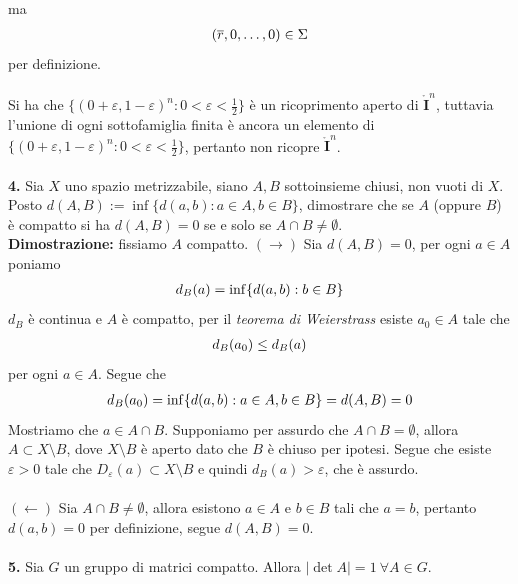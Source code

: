 \documentclass{article}
\begin{document}
ma
\begin{gather}
    (\overline{r}, 0, \dots, 0) \in \Sigma \notag
\end{gather}
per definizione. \\ \\
Si ha che $\{ (0 + \varepsilon, 1 - \varepsilon)^n : 0 < \varepsilon < \frac{1}{2} \}$ è un ricoprimento aperto di $\mathring{\mathbf{I}}^n$, tuttavia l'unione di ogni sottofamiglia finita è ancora un elemento di $\{ (0 + \varepsilon, 1 - \varepsilon)^n : 0 < \varepsilon < \frac{1}{2} \}$, pertanto non ricopre $\mathring{\mathbf{I}}^n$. \\ \\
\textbf{4.} Sia $X$ uno spazio metrizzabile, siano $A, B$ sottoinsieme chiusi, non vuoti di $X$. Posto $d(A, B) := \inf \{ d(a, b) : a \in A, b \in B \}$, dimostrare che se $A$ (oppure $B$) è compatto si ha $d(A,B) = 0$ se e solo se $A \cap B \neq \emptyset$. \\

\textbf{Dimostrazione:} fissiamo $A$ compatto. $(\rightarrow)$ Sia $d(A, B) = 0$, per ogni $a \in A$ poniamo
\begin{gather}
    d_B(a) = \inf \{ d(a, b) : b \in B \} \notag
\end{gather}
$d_B$ è continua e $A$ è compatto, per il \textit{teorema di Weierstrass} esiste $a_0 \in A$ tale che 
\begin{align}
    d_B(a_0) \leq d_B(a) \notag
\end{align}
per ogni $a \in A$. Segue che 
\begin{align}
    d_B(a_0) = \inf\{d(a, b) : a \in A, b \in B\} = d(A, B) = 0 \notag
\end{align}
Mostriamo che $a \in A \cap B$. Supponiamo per assurdo che $A \cap B = \emptyset$, allora $A \subset X \setminus B$, dove $X \setminus B$ è aperto dato che $B$ è chiuso per ipotesi. Segue che esiste $\varepsilon > 0$ tale che $D_\varepsilon(a) \subset X \setminus B$ e quindi $d_B(a) > \varepsilon$, che è assurdo. \\ \\
$(\leftarrow)$ Sia $A \cap B \neq \emptyset$, allora esistono $a \in A$ e $b \in B$ tali che $a = b$, pertanto $d(a, b) = 0$ per definizione, segue $d(A, B) = 0$. \\ \\
\textbf{5.} Sia $G$ un gruppo di matrici compatto. Allora $|\det A| = 1 \ \forall A \in G$. \\
\end{document}
